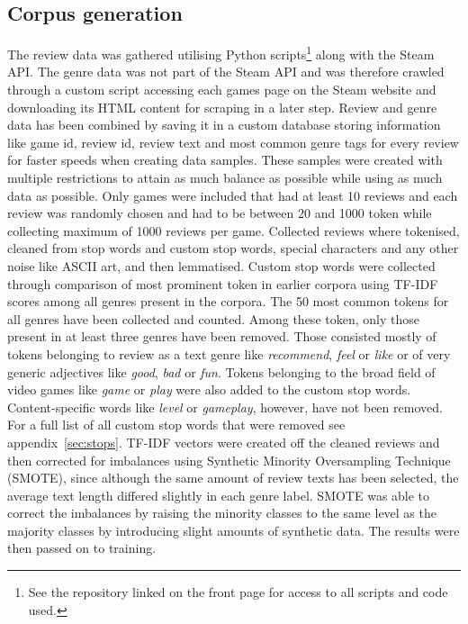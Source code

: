 \documentclass[11pt, a4paper]{article}
\begin{document}
\subsection{Corpus generation}\label{subsec:corpus-generation}
The review data was gathered utilising Python scripts\footnote{See the repository linked on the front page for access
to all scripts and code used.} along with the Steam API. The genre data was not part of the Steam API and was therefore
crawled through a custom script accessing each games page on the Steam website and downloading its HTML content for
scraping in a later step.
Review and genre data has been combined by saving it in a custom database storing information like game id, review id,
review text and most common genre tags for every review for faster speeds when creating data samples.
These samples were created with multiple restrictions to attain as much balance as possible while using as much data as
possible.
Only games were included that had at least 10 reviews and each review was randomly chosen and had to be between 20 and
1000 token while collecting maximum of 1000 reviews per game.
Collected reviews where tokenised, cleaned from stop words and custom stop words, special characters and any other
noise like ASCII art, and then lemmatised.
Custom stop words were collected through comparison of most prominent token in earlier corpora using TF-IDF scores
among all genres present in the corpora.
The 50 most common tokens for all genres have been collected and counted.
Among these token, only those present in at least three genres have been removed.
Those consisted mostly of tokens belonging to review as a text genre like \textit{recommend}, \textit{feel} or
\textit{like} or of very generic adjectives like \textit{good}, \textit{bad} or \textit{fun}.
Tokens belonging to the broad field of video games like \textit{game} or \textit{play} were also added to the custom
stop words.
Content-specific words like \textit{level} or \textit{gameplay}, however, have not been removed.
For a full list of all custom stop words that were removed see appendix~\ref{sec:stops}.
TF-IDF vectors were created off the cleaned reviews and then corrected for imbalances using Synthetic Minority
Oversampling Technique (SMOTE), since although the same amount of review texts has been selected, the average text
length differed slightly in each genre label.
SMOTE was able to correct the imbalances by raising the minority classes to the same level as the majority classes by
introducing slight amounts of synthetic data.
The results were then passed on to training.
\end{document}
